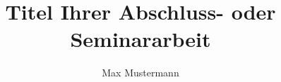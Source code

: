 \documentclass[envcountsame, envcountchap, deutsch, bibtotoc]{i-studis}
\begin{document}
\setcounter{secnumdepth}{2}
\title{Titel Ihrer Abschluss- oder Seminararbeit}
\address{im Studiengang Wirtschaftsinformatik an der\\Hochschule Trier}

\author{Max Mustermann}

\mytitlepage

\frontmatter
\tableofcontents										%
\listoffigures                        %
\listoftables                           %
\mainmatter




\backmatter
\printbibliography
\printindex												%
\begin{appendix}
    
    
\end{appendix}
\end{document}

